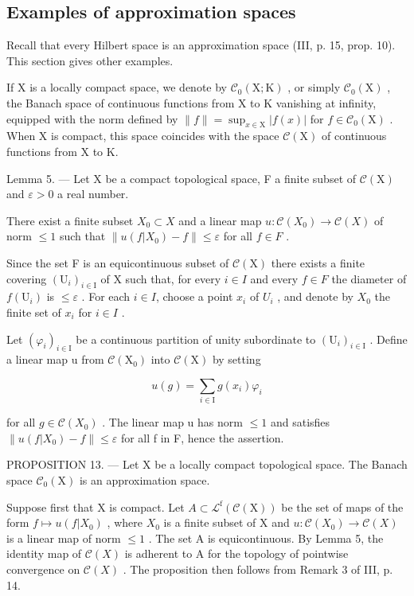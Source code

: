\subsection{Examples of approximation spaces}

Recall that every Hilbert space is an approximation space (III, p. 15, prop. 10). This section gives other examples.

If X is a locally compact space, we denote by \(\mathcal{C}_{0}(\mathrm{X};\mathrm{K})\) , or simply \(\mathcal{C}_{0}(\mathrm{X})\) , the Banach space of continuous functions from X to K vanishing at infinity, equipped with the norm defined by \(\|f\|=\sup_{x\in\mathrm{X}}|f(x)|\) for \(f\in\mathcal{C}_{0}(\mathrm{X})\) . When X is compact, this space coincides with the space \(\mathcal{C}(\mathrm{X})\) of continuous functions from X to K.

Lemma 5. --- Let X be a compact topological space, F a finite subset of \(\mathcal{C}(\mathrm{X})\) and \(\varepsilon > 0\) a real number.

There exist a finite subset \(X_{0} \subset X\) and a linear map \(u: \mathcal{C}(X_{0}) \to \mathcal{C}(X)\) of norm \(\leqslant 1\) such that \(\|u(f|X_{0}) - f\| \leqslant \varepsilon\) for all \(f \in F\) .

Since the set F is an equicontinuous subset of \(\mathcal{C}(\mathrm{X})\) there exists a finite covering \((\mathrm{U}_{i})_{i\in\mathrm{I}}\) of X such that, for every \(i\in I\) and every \(f\in F\) the diameter of \(f(\mathrm{U}_{i})\) is \(\leqslant\varepsilon\) . For each \(i\in I\), choose a point \(x_{i}\) of \(U_{i}\) , and denote by \(X_{0}\) the finite set of \(x_{i}\) for \(i\in I\) .

Let \((\varphi_{i})_{i\in\mathrm{I}}\) be a continuous partition of unity subordinate to \((\mathrm{U}_{i})_{i\in\mathrm{I}}\) . Define a linear map u from \(\mathcal{C}(\mathrm{X}_{0})\) into \(\mathcal{C}(\mathrm{X})\) by setting

\[
u (g) = \sum_ {i \in \mathrm{I}} g (x _ {i}) \varphi_ {i}
\]

for all \(g \in \mathcal{C}(X_{0})\) . The linear map u has norm \(\leqslant 1\) and satisfies \(\|u(f|X_{0}) - f\| \leqslant \varepsilon\) for all f in F, hence the assertion.

PROPOSITION 13. --- Let X be a locally compact topological space. The Banach space \(\mathcal{C}_{0}(\mathrm{X})\) is an approximation space.

Suppose first that X is compact. Let \(A \subset \mathcal{L}^{\mathrm{f}}(\mathcal{C}(\mathrm{X}))\) be the set of maps of the form \(f \mapsto u(f|X_{0})\) , where \(X_{0}\) is a finite subset of X and \(u : \mathcal{C}(X_{0}) \to \mathcal{C}(X)\) is a linear map of norm \(\leqslant 1\) . The set A is equicontinuous. By Lemma 5, the identity map of \(\mathcal{C}(X)\) is adherent to A for the topology of pointwise convergence on \(\mathcal{C}(X)\) . The proposition then follows from Remark 3 of III, p. 14.

